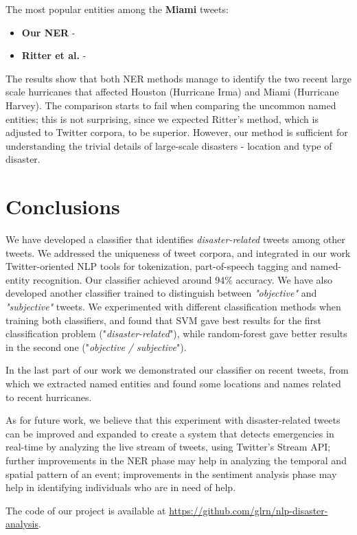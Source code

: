 \documentclass[letterpaper,twocolumn,10pt]{article}
\begin{document}
The most popular entities among the \textbf{Miami} tweets:

\begin{itemize}[noitemsep]
	\item\textbf{Our NER} - 
	\item\textbf{Ritter et al.} - 
	
\end{itemize}


The results show that both NER methods manage to identify the two recent large scale hurricanes that affected Houston (Hurricane Irma) and Miami (Hurricane Harvey).
The comparison starts to fail when comparing the uncommon named entities; this is not surprising, since we expected Ritter's method, which is adjusted to Twitter corpora, to be superior. However, our method is sufficient for understanding the trivial details of large-scale disasters - location and type of disaster.

\section{Conclusions}

We have developed a classifier that identifies \textit{disaster-related} tweets among other tweets. We addressed the uniqueness of tweet corpora, and integrated in our work Twitter-oriented NLP tools for tokenization, part-of-speech tagging and named-entity recognition. Our classifier achieved around 94\% accuracy. We have also developed another classifier trained to distinguish between \textit{"objective"} and \textit{"subjective"} tweets. We experimented with different classification methods when training both classifiers, and found that SVM gave best results for the first classification problem ("\textit{disaster-related}"), while random-forest gave better results in the second one ("\textit{objective / subjective}").

In the last part of our work we demonstrated our classifier on recent tweets, from which we extracted named entities and found some locations and names related to recent hurricanes.

As for future work, we believe that this experiment with disaster-related tweets can be improved and expanded to create a system that detects emergencies in real-time by analyzing the live stream of tweets, using Twitter's Stream API; further improvements in the NER phase may help in analyzing the temporal and spatial pattern of an event; improvements in the sentiment analysis phase may help in identifying individuals who are in need of help.

The code of our project is available at \url{https://github.com/glrn/nlp-disaster-analysis}.



{\footnotesize 
}

\theendnotes
\end{document}
